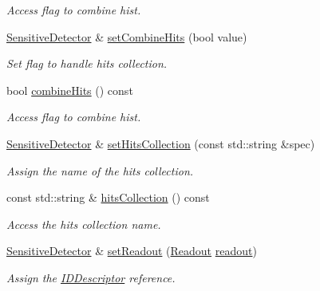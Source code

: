 \begin{DoxyCompactItemize}
\begin{DoxyCompactList}\small\item\em Access flag to combine hist. \end{DoxyCompactList}\item 
\hyperlink{class_d_d4hep_1_1_geometry_1_1_sensitive_detector}{Sensitive\+Detector} \& \hyperlink{class_d_d4hep_1_1_geometry_1_1_sensitive_detector_a934bd9f3b3c239b6fc751f2b68b26016}{set\+Combine\+Hits} (bool value)
\begin{DoxyCompactList}\small\item\em Set flag to handle hits collection. \end{DoxyCompactList}\item 
bool \hyperlink{class_d_d4hep_1_1_geometry_1_1_sensitive_detector_a30c8abbeb47ab5d892103090455b9b8a}{combine\+Hits} () const
\begin{DoxyCompactList}\small\item\em Access flag to combine hist. \end{DoxyCompactList}\item 
\hyperlink{class_d_d4hep_1_1_geometry_1_1_sensitive_detector}{Sensitive\+Detector} \& \hyperlink{class_d_d4hep_1_1_geometry_1_1_sensitive_detector_ac6d3cc86dffcd05371fe6c6d27e41b45}{set\+Hits\+Collection} (const std\+::string \&spec)
\begin{DoxyCompactList}\small\item\em Assign the name of the hits collection. \end{DoxyCompactList}\item 
const std\+::string \& \hyperlink{class_d_d4hep_1_1_geometry_1_1_sensitive_detector_aa6a837d3029a062ccd6705d5a0e7d5b1}{hits\+Collection} () const
\begin{DoxyCompactList}\small\item\em Access the hits collection name. \end{DoxyCompactList}\item 
\hyperlink{class_d_d4hep_1_1_geometry_1_1_sensitive_detector}{Sensitive\+Detector} \& \hyperlink{class_d_d4hep_1_1_geometry_1_1_sensitive_detector_a8f7a8a0c01fbddbfd645d19171d78f22}{set\+Readout} (\hyperlink{class_d_d4hep_1_1_geometry_1_1_readout}{Readout} \hyperlink{class_d_d4hep_1_1_geometry_1_1_sensitive_detector_ad79f39c5b360f7ecf2341de990131eb2}{readout})
\begin{DoxyCompactList}\small\item\em Assign the \hyperlink{class_d_d4hep_1_1_geometry_1_1_i_d_descriptor}{I\+D\+Descriptor} reference. \end{DoxyCompactList}\item 

\end{DoxyCompactItemize}
